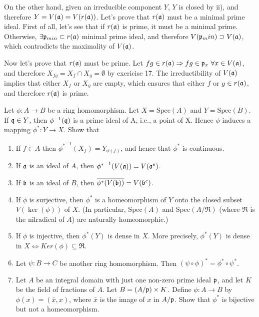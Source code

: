 \begin{sol}
\begin{enumerate}[label=(\roman*)]
		On the other hand, given an irreducible component $Y$, $Y$ is closed by ii), and therefore $Y = V(\mathfrak{a}) = V(r(\mathfrak{a}))$. Let's prove that $r(\mathfrak{a})$ must be a minimal prime ideal. First of all, let's see that if $r(\mathfrak{a})$ is prime, it must be a minimal prime. Otherwise, $\exists \mathfrak{p}_{min} \subset r(\mathfrak{a})$ minimal prime ideal, and therefore $V(\mathfrak{p}_min) \supset V(\mathfrak{a})$, which contradicts the maximality of $V(\mathfrak{a})$. 

		Now let's prove that $r(\mathfrak{a})$ must be prime. Let $fg \in r(\mathfrak{a}) \Rightarrow fg \in \mathfrak{p}_x \, \, \forall x \in V(\mathfrak{a})$, and therefore $X_{fg} = X_f \cap X_g = \emptyset$ by exericise 17. The irreductibility of $V(\mathfrak{a})$ implies that either $X_f$ or $X_g$ are empty, which ensures that either $f$ or $g$ $\in r(\mathfrak{a})$, and therefore $r(\mathfrak{a})$ is prime.
\end{enumerate}
\end{sol}

\begin{ex}
	Let $\phi: A \to B$ be a ring homomorphism. Let $X = \text{Spec}(A)$ and $Y = \text{Spec}(B)$. If $\mathfrak{q} \in Y$, then $\phi^{-1}(\mathfrak{q})$ is a prime ideal of A, i.e., a point of X. Hence $\phi$ induces a mapping $\phi^*: Y \to X$. Show that
	\begin{enumerate}[label=(\roman*)]
		\item If $f \in A$ then ${\phi^*}^{-1}(X_f) = Y_{\phi(f)}$, and hence that $\phi^*$ is continuous.
		\item If $\mathfrak{a}$ is an ideal of $A$, then ${\phi^*}^{-1}(V(\mathfrak{a})) = V(\mathfrak{a}^e)$.
		\item If $\mathfrak{b}$ is an ideal of $B$, then $\overline{\phi^*(V(\mathfrak{b}))} = V(\mathfrak{b}^c)$.
		\item If $\phi$ is surjective, then $\phi^*$ is a homeomorphism of $Y$ onto the closed subset $V(\ker(\phi))$ of $X$. (In particular, Spec$(A)$ and Spec$(A/\mathfrak{R})$ (where $\mathfrak{R}$ is the nilradical of $A$) are naturally homeomorphic.)
		\item If $\phi$ is injective, then $\phi^*(Y)$ is dense in $X$. More precisely, $\phi^*(Y)$ is dense in $X \iff Ker(\phi) \subseteq \mathfrak{R}$.
		\item Let $\psi: B \to C$ be another ring homomorphism. Then $(\psi \circ \phi)^* = \phi^* \circ \psi^*$.
		\item Let $A$ be an integral domain with just one non-zero prime ideal $\mathfrak{p}$, and let $K$ be the field of fractions of $A$. Let $B = (A/\mathfrak{p}) \times K$. Define $\phi: A \to B$ by $\phi(x) = (\bar{x}, x)$, where $\bar{x}$ is the image of $x$ in $A/\mathfrak{p}$. Show that $\phi^*$ is bijective but not a homeomorphism.
	\end{enumerate}
\end{ex}

